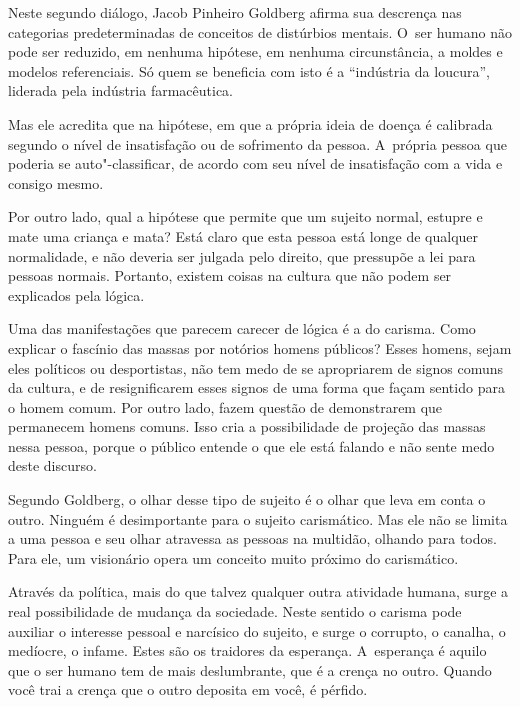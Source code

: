  


Neste segundo diálogo, Jacob Pinheiro Goldberg afirma sua descrença nas
categorias predeterminadas de conceitos de distúrbios mentais. O~ser
humano não pode ser reduzido, em nenhuma hipótese, em nenhuma
circunstância, a moldes e modelos referenciais. Só quem se beneficia com
isto é a ``indústria da loucura'', liderada pela indústria farmacêutica.

Mas ele acredita que na hipótese, em que a própria ideia de doença é
calibrada segundo o nível de insatisfação ou de sofrimento da pessoa. A~própria pessoa que poderia se auto"-classificar, de acordo com seu nível
de insatisfação com a vida e consigo mesmo.

Por outro lado, qual a hipótese que permite que um sujeito normal,
estupre e mate uma criança e mata? Está claro que esta pessoa está longe
de qualquer normalidade, e não deveria ser julgada pelo direito, que
pressupõe a lei para pessoas normais. Portanto, existem coisas na
cultura que não podem ser explicados pela lógica.

Uma das manifestações que parecem carecer de lógica é a do carisma. Como
explicar o fascínio das massas por notórios homens públicos? Esses
homens, sejam eles políticos ou desportistas, não tem medo de se
apropriarem de signos comuns da cultura, e de resignificarem esses
signos de uma forma que façam sentido para o homem comum. Por outro
lado, fazem questão de demonstrarem que permanecem homens comuns. Isso
cria a possibilidade de projeção das massas nessa pessoa, porque o
público entende o que ele está falando e não sente medo deste discurso.

Segundo Goldberg, o olhar desse tipo de sujeito é o olhar que leva em
conta o outro. Ninguém é desimportante para o sujeito carismático. Mas ele não
se limita a uma pessoa e seu olhar atravessa as pessoas na multidão,
olhando para todos. Para ele, um visionário opera um conceito muito
próximo do carismático.

Através da política, mais do que talvez qualquer outra atividade humana,
surge a real possibilidade de mudança da sociedade. Neste sentido o
carisma pode auxiliar o interesse pessoal e narcísico do sujeito, e
surge o corrupto, o canalha, o medíocre, o infame. Estes são os
traidores da esperança. A~esperança é aquilo que o ser humano tem de
mais deslumbrante, que é a crença no outro. Quando você trai a crença
que o outro deposita em você, é pérfido.

